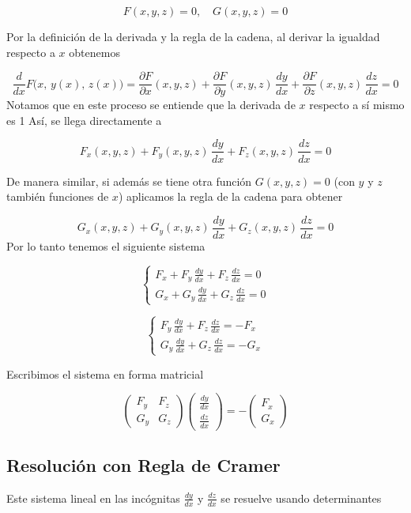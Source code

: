 \documentclass{article}
\begin{document}
\[
F(x,y,z) = 0, \quad G(x,y,z) = 0
\]

Por la definición de la derivada y la regla de la cadena, al derivar la igualdad respecto a \( x \) obtenemos

\[
\frac{d}{dx}F\bigl(x,\,y(x),\,z(x)\bigr)
=\frac{\partial F}{\partial x}(x,y,z)
+\frac{\partial F}{\partial y}(x,y,z)\,\frac{dy}{dx}
+\frac{\partial F}{\partial z}(x,y,z)\,\frac{dz}{dx}=0
\]
Notamos que en este proceso se entiende que la derivada de \( x \) respecto a sí mismo es 1 Así, se llega directamente a

\[
F_x(x,y,z)+F_y(x,y,z)\,\frac{dy}{dx}+F_z(x,y,z)\,\frac{dz}{dx}=0
\]

De manera similar, si además se tiene otra función \( G(x,y,z)=0 \) (con \( y \) y \( z \) también funciones de \( x \)) aplicamos la regla de la cadena para obtener

\[
G_x(x,y,z)+G_y(x,y,z)\,\frac{dy}{dx}+G_z(x,y,z)\,\frac{dz}{dx}=0
\]
Por lo tanto tenemos el siguiente sistema

\[
\begin{cases}
F_x+F_y\,\frac{dy}{dx}+F_z\,\frac{dz}{dx}=0 \\
G_x+G_y\,\frac{dy}{dx}+G_z\,\frac{dz}{dx}=0
\end{cases}
\]

\[
\begin{cases}
F_y\,\frac{dy}{dx}+F_z\,\frac{dz}{dx}=-F_x \\
G_y\,\frac{dy}{dx}+G_z\,\frac{dz}{dx}=-G_x
\end{cases}
\]

Escribimos el sistema en forma matricial

\[
\begin{pmatrix}
F_y & F_z \\
G_y & G_z
\end{pmatrix}
\begin{pmatrix}
\frac{dy}{dx} \\
\frac{dz}{dx}
\end{pmatrix}
=
-\begin{pmatrix}
F_x \\
G_x
\end{pmatrix}
\]

\subsection*{Resolución con Regla de Cramer}

Este sistema lineal en las incógnitas \( \frac{dy}{dx} \) y \( \frac{dz}{dx} \) se resuelve usando determinantes
\end{document}

